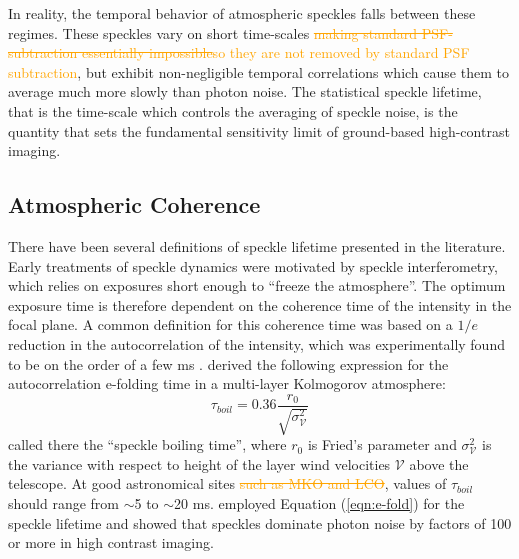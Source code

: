 \documentclass[10pt,preprint]{aastex631}
\newcommand{\ogadd}[1]{\textcolor{orange}{#1}}
\newcommand{\ogrmv}[1]{\textcolor{orange}{\sout{#1}}}
\begin{document}
In reality, the temporal behavior of atmospheric speckles falls between these regimes. These speckles vary on short time-scales \ogrmv{making standard PSF-subtraction essentially impossible}\ogadd{so they are not removed by standard PSF subtraction}, but exhibit non-negligible temporal correlations which cause them to average much more slowly than photon noise.  The statistical speckle lifetime, that is the time-scale which controls the averaging of speckle noise, is the quantity that sets the fundamental sensitivity limit of ground-based high-contrast imaging.

\subsection{Atmospheric Coherence}
There have been several definitions of speckle lifetime presented in the literature.  Early treatments of speckle dynamics were motivated by speckle interferometry, which relies on exposures short enough to ``freeze the atmosphere''.  The optimum exposure time is therefore dependent on the coherence time of the intensity in the focal plane.  A common definition for this coherence time was based on a $1/e$ reduction in the autocorrelation of the intensity, which was experimentally found to be on the order of a few ms \citep{1978ApOpt..17.3779S,1990JMOp...37.1247D}.    \citet{1982JOpt...13..263R} derived the following expression for the autocorrelation e-folding time in a multi-layer Kolmogorov atmosphere:
\begin{equation}
\tau_{boil} = 0.36 \frac{r_0}{\sqrt{\sigma^2_\mathcal{V}}}
\label{eqn:e-fold}
\end{equation}
called there the ``speckle boiling time'', where $r_0$ is Fried's parameter and $\sigma^2_\mathcal{V}$ is the variance with respect to height of the layer wind velocities $\mathcal{V}$  above the telescope.  At good astronomical sites \ogrmv{such as MKO and LCO}, values of $\tau_{boil}$ should range from $\sim$5 to $\sim$20 ms. \citet{1999PASP..111..587R} employed Equation (\ref{eqn:e-fold}) for the speckle lifetime and showed that speckles dominate photon noise by factors of 100 or more in high contrast imaging.
\end{document}
